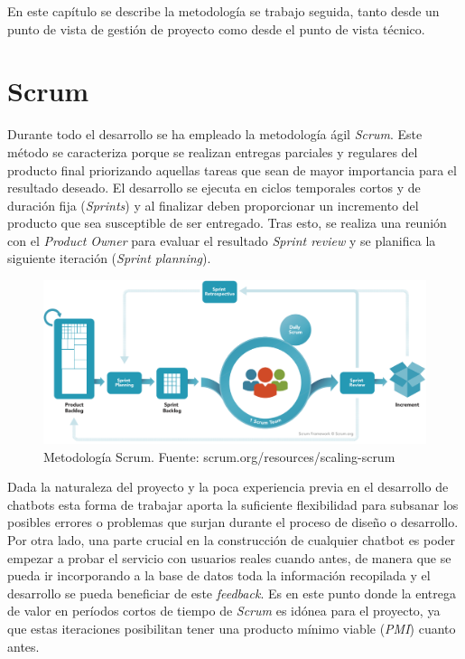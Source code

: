 En este capítulo se describe la metodología se trabajo seguida, tanto desde un punto de vista de gestión de proyecto como desde el punto de vista técnico.\\

\section{Scrum}
Durante todo el desarrollo se ha empleado la metodología ágil \textit{Scrum}. Este método se caracteriza porque se realizan entregas parciales y regulares del producto final priorizando aquellas tareas que sean de mayor importancia para el resultado deseado. El desarrollo se ejecuta en ciclos temporales cortos y de duración fija (\textit{Sprints}) y al finalizar deben proporcionar un incremento del producto que sea susceptible de ser entregado. Tras esto, se realiza una reunión con el \textit{Product Owner} para evaluar el resultado \textit{Sprint review} y se planifica la siguiente iteración (\textit{Sprint planning}).\\

\begin{figure}[h]
\centering
\includegraphics[scale=0.4]{../images/scrum.png} 
\caption{Metodología Scrum. Fuente: scrum.org/resources/scaling-scrum}
\label{fig:x scrum}
\end{figure}

Dada la naturaleza del proyecto y la poca experiencia previa en el desarrollo de chatbots esta forma de trabajar aporta la suficiente flexibilidad para subsanar los posibles errores o problemas que surjan durante el proceso de diseño o desarrollo. Por otra lado, una parte crucial en la construcción de cualquier chatbot es poder empezar a probar el servicio con usuarios reales cuando antes, de manera que se pueda ir incorporando a la base de datos toda la información recopilada y el desarrollo se pueda beneficiar de este \textit{feedback}. Es en este punto donde la entrega de valor en períodos cortos de tiempo de \textit{Scrum} es idónea para el proyecto, ya que estas iteraciones posibilitan tener una producto mínimo viable (\textit{PMI}) cuanto antes.\\


